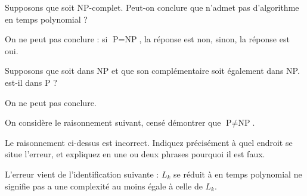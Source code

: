 \begin{exercice}[Appartenance à P/NP]
  \begin{questions}
  \item Supposons que \PROBLEM{} soit NP-complet.
    Peut-on conclure que \PROBLEM{} n'admet pas d'algorithme en temps polynomial ?
  \end{questions}
  \begin{corrections}
    On ne peut pas conclure : si $\text{P} = \text{NP}$, la réponse est non, sinon, la réponse est oui. 
  \end{corrections}

  \begin{questions}
  \item Supposons que \PROBLEM{} soit dans NP et que son complémentaire soit également dans NP.
    \PROBLEM{} est-il dans P ?
  \end{questions}
  \begin{corrections}
    On ne peut pas conclure.
  \end{corrections}
  
  On considère le raisonnement suivant, censé démontrer que $\text{P} \neq \text{NP}$.


  \begin{questions}
  \item Le raisonnement ci-dessus est incorrect.
    Indiquez précisément à quel endroit se situe l'erreur,
    et expliquez en une ou deux phrases pourquoi il est faux.
  \end{questions}
  \begin{corrections}
    L'erreur vient de l'identification suivante : 
    \og{}$L_k$ se réduit à \PROBLEM{} en temps polynomial\fg{}
    ne signifie pas
    \og{}\PROBLEM{} a une complexité au moins égale à celle de $L_k$\fg.


\end{corrections}
\end{exercice}
